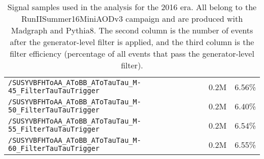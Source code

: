 \begin{table}[ht]
\begin{center}
{\begin{tabular}{|l|c|c|}
    \texttt{/SUSYVBFHToAA\_AToBB\_AToTauTau\_M-45\_FilterTauTauTrigger} & 0.2M & 6.56\%\\
    \texttt{/SUSYVBFHToAA\_AToBB\_AToTauTau\_M-50\_FilterTauTauTrigger} & 0.2M & 6.40\%\\
    \texttt{/SUSYVBFHToAA\_AToBB\_AToTauTau\_M-55\_FilterTauTauTrigger} & 0.2M & 6.54\%\\
    \texttt{/SUSYVBFHToAA\_AToBB\_AToTauTau\_M-60\_FilterTauTauTrigger} & 0.2M & 6.55\%\\
    \hline
    \end{tabular}
    }
    \end{center}
    \caption{Signal samples used in the analysis for the 2016 era. All belong to the RunIISummer16MiniAODv3 campaign and are produced with Madgraph and Pythia8. The second column is the number of events after the generator-level filter is applied, and the third column is the filter efficiency (percentage of all events that pass the generator-level filter).}
    \label{tab:2016signal}
    \end{table}
    
